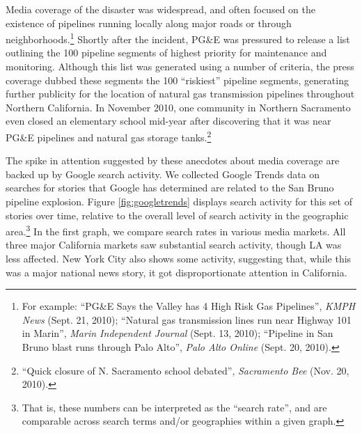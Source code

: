 \documentclass[12pt]{article}
\begin{document}
Media coverage of the disaster was widespread, and often focused on
the existence of pipelines running locally along major roads or through
neighborhoods.\footnote{For example: ``PG\&E Says the Valley has 4 High Risk Gas Pipelines'',
\emph{KMPH News} (Sept. 21, 2010); ``Natural gas transmission lines
run near Highway 101 in Marin'', \emph{Marin Independent Journal}
(Sept. 13, 2010); ``Pipeline in San Bruno blast runs through Palo
Alto'', \emph{Palo Alto Online} (Sept. 20, 2010).} Shortly after the incident, PG\&E was pressured to release a list
outlining the 100 pipeline segments of highest priority for maintenance
and monitoring. Although this list was generated using a number of
criteria, the press coverage dubbed these segments the 100 ``riskiest''
pipeline segments, generating further publicity for the location of
natural gas transmission pipelines throughout Northern California.
In November 2010, one community in Northern Sacramento even closed
an elementary school mid-year after discovering that it was near PG\&E
pipelines and natural gas storage tanks.\footnote{``Quick closure of N. Sacramento school debated'', \emph{Sacramento
Bee} (Nov. 20, 2010).}

The spike in attention suggested by these anecdotes about media coverage
are backed up by Google search activity. We collected Google Trends
data on searches for stories that Google has determined are related
to the San Bruno pipeline explosion. Figure \ref{fig:googletrends}
displays search activity for this set of stories over time, relative
to the overall level of search activity in the geographic area.\footnote{That is, these numbers can be interpreted as the ``search rate'',
and are comparable across search terms and/or geographies within a
given graph. } In the first graph, we compare search rates in various media markets.
All three major California markets saw substantial search activity,
though LA was less affected. New York City also shows some activity,
suggesting that, while this was a major national news story, it got
disproportionate attention in California. 
\end{document}

